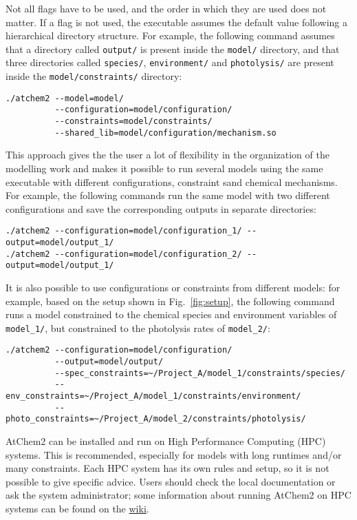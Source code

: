 Not all flags have to be used, and the order in which they are used
does not matter. If a flag is not used, the executable assumes the
default value following a hierarchical directory structure. For
example, the following command assumes that a directory called
\texttt{output/} is present inside the \texttt{model/} directory, and
that three directories called \texttt{species/}, \texttt{environment/}
and \texttt{photolysis/} are present inside the \texttt{model/constraints/}
directory:

\begin{verbatim}
./atchem2 --model=model/
          --configuration=model/configuration/
          --constraints=model/constraints/
          --shared_lib=model/configuration/mechanism.so
\end{verbatim}

This approach gives the the user a lot of flexibility in the
organization of the modelling work and makes it possible to run
several models using the same executable with different
configurations, constraint sand chemical mechanisms. For example, the
following commands run the same model with two different
configurations and save the corresponding outputs in separate
directories:

\begin{verbatim}
./atchem2 --configuration=model/configuration_1/ --output=model/output_1/
./atchem2 --configuration=model/configuration_2/ --output=model/output_1/
\end{verbatim}

It is also possible to use configurations or constraints from
different models: for example, based on the setup shown in
Fig.~\ref{fig:setup}, the following command runs a model constrained
to the chemical species and environment variables of \texttt{model\_1/},
but constrained to the photolysis rates of \texttt{model\_2/}:

\begin{verbatim}
./atchem2 --configuration=model/configuration/
          --output=model/output/
          --spec_constraints=~/Project_A/model_1/constraints/species/
          --env_constraints=~/Project_A/model_1/constraints/environment/
          --photo_constraints=~/Project_A/model_2/constraints/photolysis/
\end{verbatim}

AtChem2 can be installed and run on High Performance Computing (HPC)
systems. This is recommended, especially for models with long runtimes
and/or many constraints. Each HPC system has its own rules and setup,
so it is not possible to give specific advice. Users should check the
local documentation or ask the system administrator; some information
about running AtChem2 on HPC systems can be found on the
\href{https://github.com/AtChem/AtChem2/wiki/Running-on-HPC}{wiki}.

